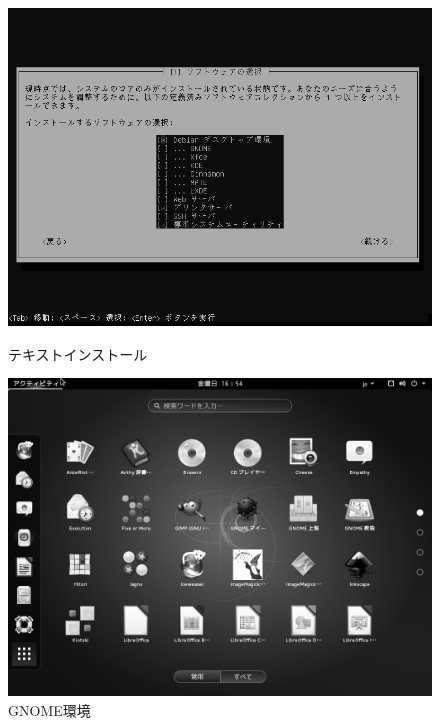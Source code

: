 \documentclass[mingoth,a4paper]{jsarticle}
\begin{document}
\begin{figure}[htbp]
 \begin{minipage}{0.5\hsize}
  \begin{center}
   \includegraphics[width=0.8\hsize]{image201509/debian8-inst-03_mono.png}
  \end{center}
  \caption{テキストインストール}
 \end{minipage}
 \begin{minipage}{0.5\hsize}
  \begin{center}
   \includegraphics[width=0.8\hsize]{image201509/debian8-gnome_mono.png}
  \end{center}
  \caption{GNOME環境}
 \end{minipage}
\end{figure}
\end{document}
